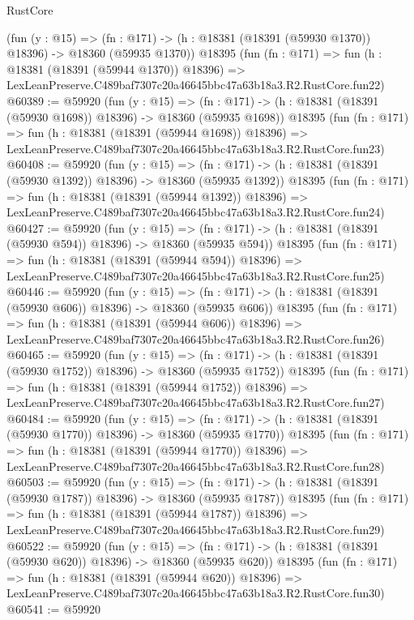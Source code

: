 \begin{lexlean}{RustCore}
\begin{coremodule}
    (fun (y : @15) =>
    (fn : @171) -> (h : @18381 (@18391 (@59930 @1370)) @18396) -> @18360 (@59935 @1370))
    @18395
    (fun (fn : @171) =>
    fun (h : @18381 (@18391 (@59944 @1370)) @18396) =>
    LexLeanPreserve.C489baf7307c20a46645bbc47a63b18a3.R2.RustCore.fun22)
@60389 := @59920
    (fun (y : @15) =>
    (fn : @171) -> (h : @18381 (@18391 (@59930 @1698)) @18396) -> @18360 (@59935 @1698))
    @18395
    (fun (fn : @171) =>
    fun (h : @18381 (@18391 (@59944 @1698)) @18396) =>
    LexLeanPreserve.C489baf7307c20a46645bbc47a63b18a3.R2.RustCore.fun23)
@60408 := @59920
    (fun (y : @15) =>
    (fn : @171) -> (h : @18381 (@18391 (@59930 @1392)) @18396) -> @18360 (@59935 @1392))
    @18395
    (fun (fn : @171) =>
    fun (h : @18381 (@18391 (@59944 @1392)) @18396) =>
    LexLeanPreserve.C489baf7307c20a46645bbc47a63b18a3.R2.RustCore.fun24)
@60427 := @59920
    (fun (y : @15) =>
    (fn : @171) -> (h : @18381 (@18391 (@59930 @594)) @18396) -> @18360 (@59935 @594))
    @18395
    (fun (fn : @171) =>
    fun (h : @18381 (@18391 (@59944 @594)) @18396) =>
    LexLeanPreserve.C489baf7307c20a46645bbc47a63b18a3.R2.RustCore.fun25)
@60446 := @59920
    (fun (y : @15) =>
    (fn : @171) -> (h : @18381 (@18391 (@59930 @606)) @18396) -> @18360 (@59935 @606))
    @18395
    (fun (fn : @171) =>
    fun (h : @18381 (@18391 (@59944 @606)) @18396) =>
    LexLeanPreserve.C489baf7307c20a46645bbc47a63b18a3.R2.RustCore.fun26)
@60465 := @59920
    (fun (y : @15) =>
    (fn : @171) -> (h : @18381 (@18391 (@59930 @1752)) @18396) -> @18360 (@59935 @1752))
    @18395
    (fun (fn : @171) =>
    fun (h : @18381 (@18391 (@59944 @1752)) @18396) =>
    LexLeanPreserve.C489baf7307c20a46645bbc47a63b18a3.R2.RustCore.fun27)
@60484 := @59920
    (fun (y : @15) =>
    (fn : @171) -> (h : @18381 (@18391 (@59930 @1770)) @18396) -> @18360 (@59935 @1770))
    @18395
    (fun (fn : @171) =>
    fun (h : @18381 (@18391 (@59944 @1770)) @18396) =>
    LexLeanPreserve.C489baf7307c20a46645bbc47a63b18a3.R2.RustCore.fun28)
@60503 := @59920
    (fun (y : @15) =>
    (fn : @171) -> (h : @18381 (@18391 (@59930 @1787)) @18396) -> @18360 (@59935 @1787))
    @18395
    (fun (fn : @171) =>
    fun (h : @18381 (@18391 (@59944 @1787)) @18396) =>
    LexLeanPreserve.C489baf7307c20a46645bbc47a63b18a3.R2.RustCore.fun29)
@60522 := @59920
    (fun (y : @15) =>
    (fn : @171) -> (h : @18381 (@18391 (@59930 @620)) @18396) -> @18360 (@59935 @620))
    @18395
    (fun (fn : @171) =>
    fun (h : @18381 (@18391 (@59944 @620)) @18396) =>
    LexLeanPreserve.C489baf7307c20a46645bbc47a63b18a3.R2.RustCore.fun30)
@60541 := @59920

\end{coremodule}
\end{lexlean}
